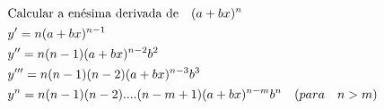\begin{ex}
\begin{align}
&\text{Calcular a enésima derivada de}\quad (a+bx)^{n}\nonumber\\
&y'=n(a+bx)^{n-1}\nonumber\\
&y''=n(n-1)(a+bx)^{n-2}b^2\nonumber\\
&y'''=n(n-1)(n-2)(a+bx)^{n-3}b^3\nonumber\\
&y^{n}=n(n-1)(n-2)....(n-m+1)(a+bx)^{n-m}b^{n} \quad\text(para\quad  n>m)\nonumber
\end{align}
\end{ex}